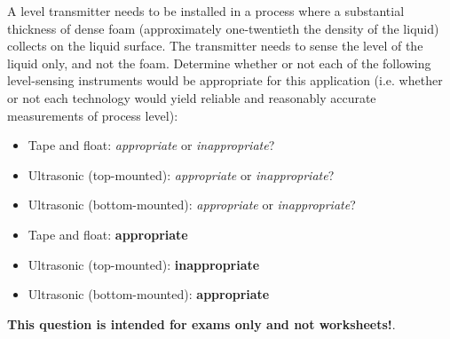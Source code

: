 

A level transmitter needs to be installed in a process where a substantial thickness of dense foam (approximately one-twentieth the density of the liquid) collects on the liquid surface.  The transmitter needs to sense the level of the liquid only, and not the foam.  Determine whether or not each of the following level-sensing instruments would be appropriate for this application (i.e. whether or not each technology would yield reliable and reasonably accurate measurements of process level):

\begin{itemize}
\item{} Tape and float: {\it appropriate} or {\it inappropriate}?
\vskip 10pt
\item{} Ultrasonic (top-mounted): {\it appropriate} or {\it inappropriate}?
\vskip 10pt
\item{} Ultrasonic (bottom-mounted): {\it appropriate} or {\it inappropriate}?
\end{itemize}







\begin{itemize}
\item{} Tape and float: {\bf appropriate}
\vskip 10pt
\item{} Ultrasonic (top-mounted): {\bf inappropriate}
\vskip 10pt
\item{} Ultrasonic (bottom-mounted): {\bf appropriate}
\end{itemize}







{\bf This question is intended for exams only and not worksheets!}.



